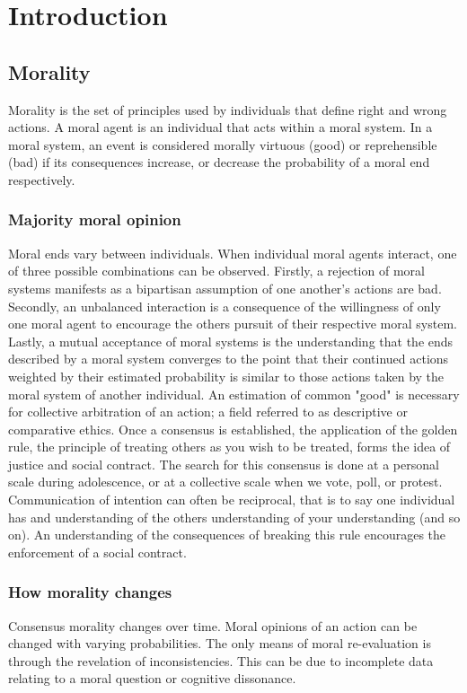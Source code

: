 \chapter{Introduction}
\section{Morality}
Morality is the set of principles used by individuals that define right and wrong actions.
A moral agent is an individual that acts within a moral system.
In a moral system, an event is considered morally virtuous (good) or reprehensible (bad) if its consequences increase, or decrease the probability of a moral end respectively.

\subsection{Majority moral opinion}
Moral ends vary between individuals.
When individual moral agents interact, one of three possible combinations can be observed.
Firstly, a rejection of moral systems manifests as a bipartisan assumption of one another's actions are bad. 
Secondly, an unbalanced interaction is a consequence of the willingness of only one moral agent to encourage the others pursuit of their respective moral system.
Lastly, a mutual acceptance of moral systems is the understanding that the ends described by a moral system converges to the point that their continued actions weighted by their estimated probability is similar to those actions taken by the moral system of another individual.
An estimation of common "good" is necessary for collective arbitration of an action; a field referred to as descriptive or comparative ethics.
Once a consensus is established, the application of the golden rule, the principle of treating others as you wish to be treated, forms the idea of justice and social contract.
The search for this consensus is done at a personal scale during adolescence, or at a collective scale when we vote, poll, or protest.
Communication of intention can often be reciprocal, that is to say one individual has and understanding of the others understanding of your understanding (and so on).
An understanding of the consequences of breaking this rule encourages the enforcement of a social contract.

\subsection{How morality changes}
Consensus morality changes over time.
Moral opinions of an action can be changed with varying probabilities.
The only means of moral re-evaluation is through the revelation of inconsistencies.
This can be due to incomplete data relating to a moral question or cognitive dissonance.

